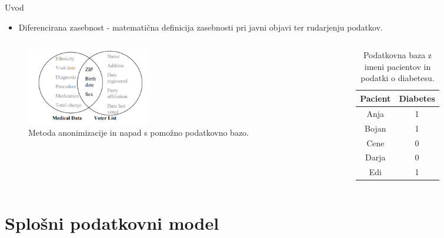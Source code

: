 \documentclass{beamer}
\begin{document}
\begin{frame}{Uvod}

  \begin{itemize}
  \item Diferencirana zasebnost - matematična definicija zasebnosti pri javni objavi ter rudarjenju podatkov.
 \end{itemize}
 \begin{columns}
 
\begin{column}{5.4cm}
\begin{figure}
\includegraphics[width=5.4cm]{slika1} 
\caption{Metoda anonimizacije in napad s pomožno podatkovno bazo.}
\end{figure}
\end{column}

\begin{column}{5.4cm}
\begin{table}
\begin{center}
 \begin{tabular}{| c | c |} 
 \hline
 \textbf{Pacient} & \textbf{Diabetes}  \\ [0.5ex] 
 \hline
 Anja & 1  \\ 
 \hline
 Bojan & 1\\
 \hline
 Cene & 0 \\
 \hline
 Darja & 0  \\
 \hline
 Edi & 1  \\  
 \hline
\end{tabular}
\caption{Podatkovna baza z imeni pacientov in podatki o diabetesu.}
\end{center}
\end{table}
\end{column}

\end{columns}
\end{frame}


\section{Splošni podatkovni model}
\end{document}
